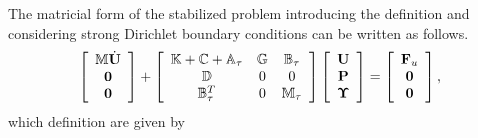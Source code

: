 The matricial form of the stabilized problem  introducing the definition  and considering strong Dirichlet boundary conditions can be written as follows. 
\begin{equation}
\label{eq-C7_NSmatform}
\left[\begin{array}{c}
\mathbb{M}\dot{{\bf U}}\\
\mathbf{0}\\
\mathbf{0}
\end{array}\right]+\left[\begin{array}{ccc}
\mathbb{K}+\mathbb{C}+\mathbb{A}_\tau&\mathbb{G}&\mathbb{B}_\tau\\
\mathbb{D}&0&0\\
\mathbb{B}_\tau^T&0&\mathbb{M}_\tau
\end{array}\right]\left[\begin{array}{c}
{\bf U}\\
{\bf P}\\
\boldsymbol{\Upsilon}
\end{array}\right]=\left[\begin{array}{c}
{\bf F}_u\\
\mathbf{0}\\
\mathbf{0}
\end{array}\right],
\end{equation}
which definition are given by
